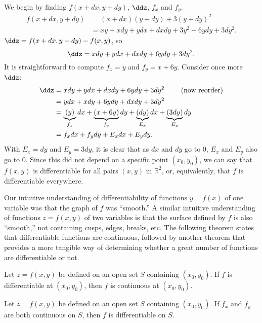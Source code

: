 {We begin by finding $f(x+dx,y+dy)$, $\ddz$, $f_x$ and $f_y$.
\begin{align*}
f(x+dx,y+dy) &= (x+dx)(y+dy) + 3(y+dy)^2 \\
						&= xy + xdy+ydx+dxdy + 3y^2+6ydy+3dy^2.
\end{align*}
$\ddz = f(x+dx,y+dy) - f(x,y)$, so
\[\ddz = xdy + ydx + dxdy + 6ydy+3dy^2.\]
It is straightforward to compute $f_x = y$ and $f_y = x+6y$. Consider once more $\ddz$:
\begin{align*}
\ddz &= xdy + ydx + dxdy + 6ydy+3dy^2 \qquad \text{ (now reorder)}\\
		&= ydx + xdy+6ydy+ dxdy + 3dy^2\\
		&= \underbrace{(y)}_{f_x}dx + \underbrace{(x+6y)}_{f_y}dy + \underbrace{(dy)}_{E_x}dx+\underbrace{(3dy)}_{E_y}dy\\
		&= f_xdx + f_ydy + E_xdx+E_ydy.
\end{align*}
With $E_x = dy$ and $E_y = 3dy$, it is clear that as $dx$ and $ dy$ go to 0, $E_x$ and $E_y$ also go to 0. Since this did not depend on a specific point $(x_0,y_0)$, we can say that $f(x,y)$ is differentiable for all pairs $(x,y)$ in $\mathbb{R}^2$, or, equivalently, that $f$ is differentiable everywhere. }

Our intuitive understanding of differentiability of functions $y=f(x)$ of one variable was that the graph of $f$ was ``smooth.'' A similar intuitive understanding of functions $z=f(x,y)$ of two variables is that the surface defined by $f$ is also ``smooth,'' not containing cusps, edges, breaks,  etc. The following theorem states that differentiable functions are continuous, followed by another theorem that   provides a
more tangible way of determining whether a great number of functions are differentiable or not.

{Let $z=f(x,y)$ be defined on an open set $S$ containing $(x_0,y_0)$. 
If $f$ is differentiable at $(x_0,y_0)$, then $f$ is continuous at $(x_0,y_0)$.
}

{Let $z=f(x,y)$ be defined on an open set $S$ containing $(x_0,y_0)$. 
If $f_x$ and $f_y$ are both continuous on $S$, then $f$ is differentiable on $S$.
}

